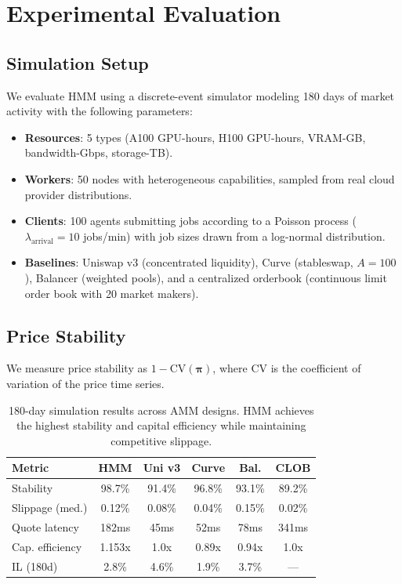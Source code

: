 \section{Experimental Evaluation}

\label{sec:experiments}

\subsection{Simulation Setup}

We evaluate HMM using a discrete-event simulator modeling 180 days of market activity with the following parameters:

\begin{itemize}[leftmargin=1.1em]
    \item \textbf{Resources}: 5 types (A100 GPU-hours, H100 GPU-hours, VRAM-GB, bandwidth-Gbps, storage-TB).
    \item \textbf{Workers}: 50 nodes with heterogeneous capabilities, sampled from real cloud provider distributions.
    \item \textbf{Clients}: 100 agents submitting jobs according to a Poisson process ($\lambda_{\text{arrival}} = 10$ jobs/min) with job sizes drawn from a log-normal distribution.
    \item \textbf{Baselines}: Uniswap v3 (concentrated liquidity), Curve (stableswap, $A = 100$), Balancer (weighted pools), and a centralized orderbook (continuous limit order book with 20 market makers).
\end{itemize}

\subsection{Price Stability}

We measure price stability as $1 - \text{CV}(\bm{\pi})$, where $\text{CV}$ is the coefficient of variation of the price time series.

\begin{table}[H]
\centering
\small
\begin{tabular}{lccccc}
\toprule
\textbf{Metric} & \textbf{HMM} & \textbf{Uni v3} & \textbf{Curve} & \textbf{Bal.} & \textbf{CLOB} \\
\midrule
Stability & 98.7\% & 91.4\% & 96.8\% & 93.1\% & 89.2\% \\
Slippage (med.) & 0.12\% & 0.08\% & 0.04\% & 0.15\% & 0.02\% \\
Quote latency & 182ms & 45ms & 52ms & 78ms & 341ms \\
Cap. efficiency & 1.153x & 1.0x & 0.89x & 0.94x & 1.0x \\
IL (180d) & 2.8\% & 4.6\% & 1.9\% & 3.7\% & --- \\
\bottomrule
\end{tabular}
\caption{180-day simulation results across AMM designs. HMM achieves the highest stability and capital efficiency while maintaining competitive slippage.}
\label{tab:simulation}
\end{table}

